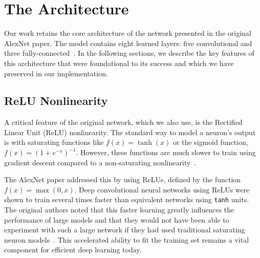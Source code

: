 \documentclass{article}
\begin{document}
\section{The Architecture}
\label{sec:architecture}
\noindent
Our work retains the core architecture of the network presented in the original AlexNet paper. The model contains eight learned layers: five convolutional and three fully-connected~\cite{krizhevsky2012imagenet}. In the following sections, we describe the key features of this architecture that were foundational to its success and which we have preserved in our implementation.

\subsection{ReLU Nonlinearity}
\label{subsec:relu}
\noindent
A critical feature of the original network, which we also use, is the Rectified Linear Unit (ReLU) nonlinearity. The standard way to model a neuron’s output is with saturating functions like $f(x) = \tanh(x)$ or the sigmoid function, $f(x) = (1 + e^{-x})^{-1}$. However, these functions are much slower to train using gradient descent compared to a non-saturating nonlinearity~\cite{nair2010rectified}.

The AlexNet paper addressed this by using ReLUs, defined by the function $f(x) = \max(0, x)$. Deep convolutional neural networks using ReLUs were shown to train several times faster than equivalent networks using \texttt{tanh} units. The original authors noted that this faster learning greatly influences the performance of large models and that they would not have been able to experiment with such a large network if they had used traditional saturating neuron models~\cite{krizhevsky2012imagenet}. This accelerated ability to fit the training set remains a vital component for efficient deep learning today.
\end{document}
